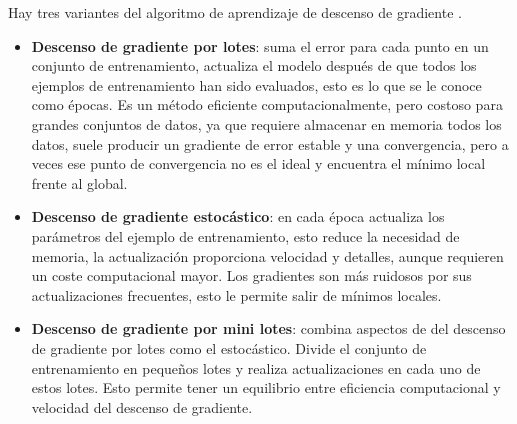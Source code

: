 Hay tres variantes del algoritmo de aprendizaje de descenso de gradiente \cite{ibm-gradient-descent}.

\begin{itemize}
    \item \textbf{Descenso de gradiente por lotes}: suma el error para cada punto en un conjunto de entrenamiento, actualiza el modelo después de que todos los ejemplos de entrenamiento han sido evaluados, esto es lo que se le conoce como épocas. Es un método eficiente computacionalmente, pero costoso para grandes conjuntos de datos, ya que requiere almacenar en memoria todos los datos, suele producir un gradiente de error estable y una convergencia, pero a veces ese punto de convergencia no es el ideal y encuentra el mínimo local frente al global.
    \item \textbf{Descenso de gradiente estocástico}: en cada época actualiza los parámetros del ejemplo de entrenamiento, esto reduce la necesidad de memoria, la actualización proporciona velocidad y detalles, aunque requieren un coste computacional mayor. Los gradientes son más ruidosos por sus actualizaciones frecuentes, esto le permite salir de mínimos locales.
    \item \textbf{Descenso de gradiente por mini lotes}: combina aspectos de del descenso de gradiente por lotes como el estocástico. Divide el conjunto de entrenamiento en pequeños lotes y realiza actualizaciones en cada uno de estos lotes. Esto permite tener un equilibrio entre eficiencia computacional y velocidad del descenso de gradiente.
\end{itemize}


